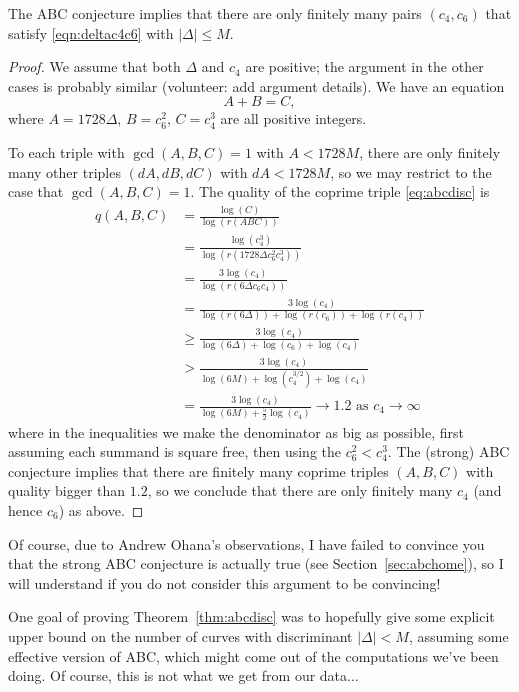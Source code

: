 \documentclass{book}
\begin{document}
\begin{theorem}\label{thm:abcdisc}
The ABC conjecture implies
that there are only finitely
many pairs $(c_4, c_6)$ that satisfy
\eqref{eqn:deltac4c6} with
$|\Delta|\leq M$.
\end{theorem}
\begin{proof}
We assume that both $\Delta$ and $c_4$ are positive; the argument
in the other cases is probably similar (volunteer: add argument details).
We have an equation
\begin{equation}\label{eq:abcdisc}
  A + B = C,
\end{equation}
where $A = 1728\Delta$, $B=c_6^2$, $C=c_4^3$ are all positive integers.

To each triple with $\gcd(A,B,C)=1$
with $A<1728 M$,
there are only finitely many other triples
$(dA,dB,dC)$ with $dA<1728 M$, so
we may restrict to the case that $\gcd(A,B,C)=1$.
The quality of the coprime triple \eqref{eq:abcdisc} is
\begin{align*}
  q(A,B,C) &= \frac{\log(C)}{\log(r(ABC))}\\
      &= \frac{\log(c_4^3)}{\log(r(1728\Delta c_6^2 c_4^3))}\\
      &= \frac{3\log(c_4)}{\log(r(6\Delta c_6 c_4))}\\
      &= \frac{3\log(c_4)}{\log(r(6\Delta)) + \log(r(c_6)) +
         \log(r( c_4))}\\
      &\geq  \frac{3\log(c_4)}{\log(6\Delta) + \log(c_6) +
         \log(c_4)}\\
      &> \frac{3\log(c_4)}{\log(6M) + \log(c_4^{3/2}) +
         \log(c_4)}\\
      &= \frac{3\log(c_4)}{\log(6M) + \frac{5}{2}\log(c_4)}
      \to 1.2 \text{ as $c_4\to\infty$}
\end{align*}
where in the inequalities we make the denominator
as big as possible, first assuming each summand is square
free, then using the $c_6^2 < c_4^3$.
The (strong) ABC conjecture implies
that there are finitely many coprime triples $(A,B,C)$
with quality bigger than $1.2$, so we conclude
that there are only finitely many
$c_4$ (and hence $c_6$) as above.
\end{proof}

Of course, due to Andrew Ohana's observations,
I have failed to convince you
that the strong ABC conjecture is actually true (see Section~\ref{sec:abchome}),
so I will understand if you do not consider this argument
to be convincing!

One goal of proving Theorem~\ref{thm:abcdisc} was to hopefully
give some explicit upper bound on the number of curves with
discriminant $|\Delta| < M$, assuming some effective version
of ABC, which might come out of the computations we've been
doing.   Of course, this is not what we get from our data...
\end{document}
